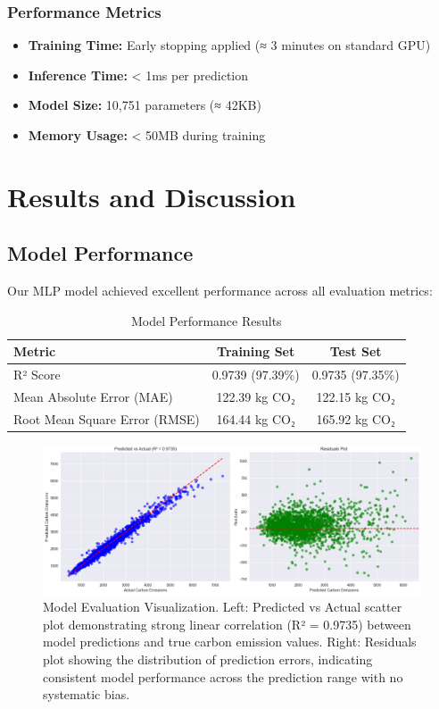 \documentclass[12pt,a4paper]{article}
\begin{document}
\subsubsection{Performance Metrics}
\begin{itemize}
    \item \textbf{Training Time:} Early stopping applied (≈ 3 minutes on standard GPU)
    \item \textbf{Inference Time:} < 1ms per prediction
    \item \textbf{Model Size:} 10,751 parameters (≈ 42KB)
    \item \textbf{Memory Usage:} < 50MB during training
\end{itemize}

\section{Results and Discussion}

\subsection{Model Performance}

Our MLP model achieved excellent performance across all evaluation metrics:

\begin{table}[H]
\centering
\caption{Model Performance Results}
\begin{tabular}{@{}lcc@{}}
\toprule
Metric & Training Set & Test Set \\
\midrule
R² Score & 0.9739 (97.39\%) & 0.9735 (97.35\%) \\
Mean Absolute Error (MAE) & 122.39 kg CO₂ & 122.15 kg CO₂ \\
Root Mean Square Error (RMSE) & 164.44 kg CO₂ & 165.92 kg CO₂ \\
\bottomrule
\end{tabular}
\end{table}

\begin{figure}[H]
\centering
\includegraphics[width=\textwidth]{eval_result.png}
\caption{Model Evaluation Visualization. Left: Predicted vs Actual scatter plot demonstrating strong linear correlation (R² = 0.9735) between model predictions and true carbon emission values. Right: Residuals plot showing the distribution of prediction errors, indicating consistent model performance across the prediction range with no systematic bias.}
\label{fig:evaluation}
\end{figure}
\end{document}
